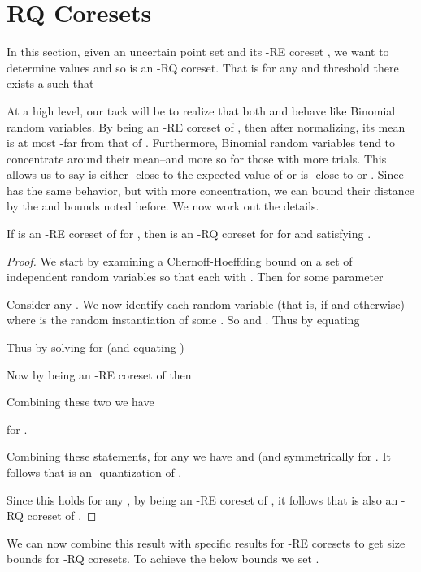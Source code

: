 \documentclass[11pt]{myclass}
\newcommand{\RE}{\textsf{RE}\xspace}
\newcommand{\RQ}{\textsf{RQ}\xspace}
\begin{document}
\section{\RQ Coresets}



In this section, given an uncertain point set  and its -\RE coreset , we want to determine values  and  so  is an -\RQ coreset.  
That is for any  and threshold  there exists a  such that 


At a high level, our tack will be to realize that both  and  behave like Binomial random variables.  By  being an -\RE coreset of , then after normalizing, its mean is at most -far from that of .  Furthermore, Binomial random variables tend to concentrate around their mean--and more so for those with more trials.  This allows us to say  is either -close to the expected value of  or is -close to  or .  Since  has the same behavior, but with more concentration, we can bound their distance by the  and  bounds noted before.  We now work out the details.  
  
\begin{theorem}
If  is an -\RE coreset of  for , 
then   is an -\RQ coreset for  for  and satisfying
.  
\label{thm:RQ-CLM}
\end{theorem}
\begin{proof}
We start by examining a Chernoff-Hoeffding bound on a set of independent random variables   so that each  with .  Then for some parameter  


Consider any .  
We now identify each random variable  (that is,  if  and  otherwise) where  is the random instantiation of some .  So  and .  
Thus by equating 

Thus by solving for  (and equating )

Now by  being an -\RE coreset of  then 

Combining these two we have

for .  



Combining these statements, for any  
we have 
 and  (and symmetrically for .  
It follows that  is an -quantization of .  

Since this holds for any , by  being an -\RE coreset of , it follows that  is also an -\RQ coreset of .  
\end{proof}



We can now combine this result with specific results for -\RE coresets to get size bounds for -\RQ coresets.  To achieve the below bounds we set .  
\end{document}
